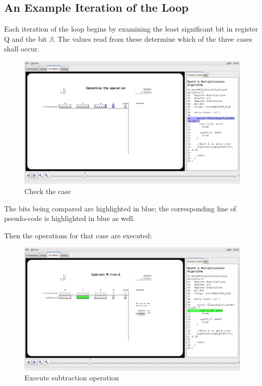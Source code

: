 \documentclass{article}
\begin{document}
\pagebreak
\subsection{An Example Iteration of the Loop}
Each iteration of the loop begins by examining the least significant bit in register Q and the bit $\beta$.
The values read from these determine which of the three cases shall occur.

\begin{figure}[h]
\centering
\includegraphics[scale=0.3]{cases.pdf}
\caption{Check the case}
\end{figure}

The bits being compared are highlighted in blue; the corresponding line of pseudo-code is highlighted in blue as well.

\pagebreak
Then the operations for that case are executed:

\begin{figure}[h]
\centering
\includegraphics[scale=0.3]{sub.pdf}
\caption{Execute subtraction operation}
\end{figure}
\end{document}
